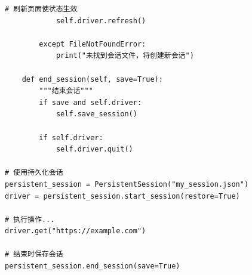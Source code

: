 \begin{lstlisting}[style=demostyle,numbers=none]
            # 刷新页面使状态生效
            self.driver.refresh()
            
        except FileNotFoundError:
            print("未找到会话文件，将创建新会话")
    
    def end_session(self, save=True):
        """结束会话"""
        if save and self.driver:
            self.save_session()
        
        if self.driver:
            self.driver.quit()

# 使用持久化会话
persistent_session = PersistentSession("my_session.json")
driver = persistent_session.start_session(restore=True)

# 执行操作...
driver.get("https://example.com")

# 结束时保存会话
persistent_session.end_session(save=True)
\end{lstlisting}
